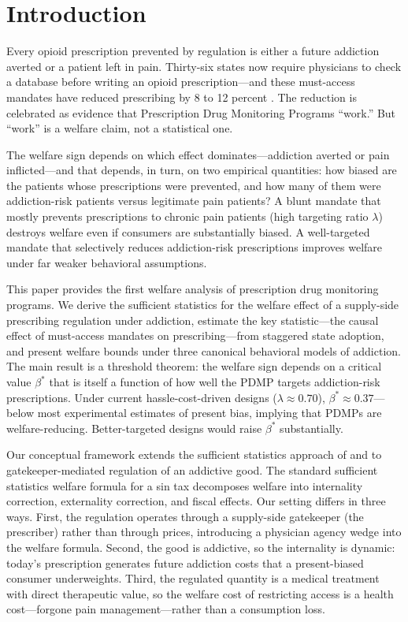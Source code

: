 \documentclass[12pt]{article}
\begin{document}
\section{Introduction}\label{sec:introduction}

Every opioid prescription prevented by regulation is either a future addiction averted or a patient left in pain. Thirty-six states now require physicians to check a database before writing an opioid prescription---and these must-access mandates have reduced prescribing by 8 to 12 percent \citep{buchmueller2018effect}. The reduction is celebrated as evidence that Prescription Drug Monitoring Programs ``work.'' But ``work'' is a welfare claim, not a statistical one.

The welfare sign depends on which effect dominates---addiction averted or pain inflicted---and that depends, in turn, on two empirical quantities: how biased are the patients whose prescriptions were prevented, and how many of them were addiction-risk patients versus legitimate pain patients? A blunt mandate that mostly prevents prescriptions to chronic pain patients (high targeting ratio $\lambda$) destroys welfare even if consumers are substantially biased. A well-targeted mandate that selectively reduces addiction-risk prescriptions improves welfare under far weaker behavioral assumptions.

This paper provides the first welfare analysis of prescription drug monitoring programs. We derive the sufficient statistics for the welfare effect of a supply-side prescribing regulation under addiction, estimate the key statistic---the causal effect of must-access mandates on prescribing---from staggered state adoption, and present welfare bounds under three canonical behavioral models of addiction. The main result is a threshold theorem: the welfare sign depends on a critical value $\beta^*$ that is itself a function of how well the PDMP targets addiction-risk prescriptions. Under current hassle-cost-driven designs ($\lambda \approx 0.70$), $\beta^* \approx 0.37$---below most experimental estimates of present bias, implying that PDMPs are welfare-reducing. Better-targeted designs would raise $\beta^*$ substantially.

Our conceptual framework extends the sufficient statistics approach of \citet{chetty2009sufficient} and \citet{allcott2019regressive} to gatekeeper-mediated regulation of an addictive good. The standard sufficient statistics welfare formula for a sin tax decomposes welfare into internality correction, externality correction, and fiscal effects. Our setting differs in three ways. First, the regulation operates through a supply-side gatekeeper (the prescriber) rather than through prices, introducing a physician agency wedge into the welfare formula. Second, the good is addictive, so the internality is dynamic: today's prescription generates future addiction costs that a present-biased consumer underweights. Third, the regulated quantity is a medical treatment with direct therapeutic value, so the welfare cost of restricting access is a health cost---forgone pain management---rather than a consumption loss.
\end{document}
